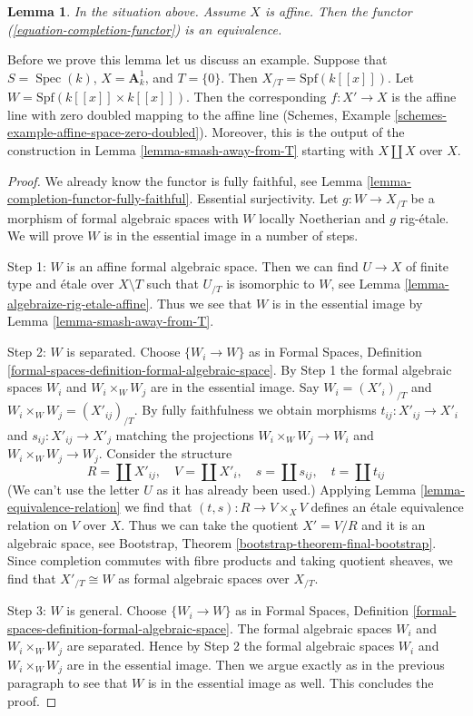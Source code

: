 \documentclass{stacks-project}
\theoremstyle{plain}
\newtheorem{lemma}[subsection]{Lemma}
\theoremstyle{definition}
\theoremstyle{remark}
\numberwithin{equation}{subsection}
\def\Spec{\mathop{\mathrm{Spec}}}
\begin{document}
\begin{lemma}
\label{lemma-dilatations-affine}
In the situation above. Assume $X$ is affine. Then the functor
(\ref{equation-completion-functor}) is an equivalence.
\end{lemma}

\noindent
Before we prove this lemma let us discuss an example. Suppose that
$S = \Spec(k)$, $X = \mathbf{A}^1_k$, and $T = \{0\}$. Then
$X_{/T} = \text{Spf}(k[[x]])$. Let $W = \text{Spf}(k[[x]] \times k[[x]])$.
Then the corresponding $f : X' \to X$ is the affine line with zero doubled
mapping to the affine line
(Schemes, Example \ref{schemes-example-affine-space-zero-doubled}).
Moreover, this is the output of the construction in
Lemma \ref{lemma-smash-away-from-T}
starting with $X \amalg X$ over $X$.

\begin{proof}
We already know the functor is fully faithful, see
Lemma \ref{lemma-completion-functor-fully-faithful}.
Essential surjectivity. Let $g : W \to X_{/T}$ be a morphism
of formal algebraic spaces with $W$ locally Noetherian
and $g$ rig-\'etale. We will prove $W$ is in the essential
image in a number of steps.

\medskip\noindent
Step 1: $W$ is an affine formal algebraic space. Then we can find
$U \to X$ of finite type and \'etale over $X \setminus T$ such that
$U_{/T}$ is isomorphic to $W$, see
Lemma \ref{lemma-algebraize-rig-etale-affine}.
Thus we see that $W$ is in the essential image by
Lemma \ref{lemma-smash-away-from-T}.

\medskip\noindent
Step 2: $W$ is separated. Choose $\{W_i \to W\}$ as in
Formal Spaces, Definition \ref{formal-spaces-definition-formal-algebraic-space}.
By Step 1 the formal algebraic spaces $W_i$ and $W_i \times_W W_j$
are in the essential image.
Say $W_i = (X'_i)_{/T}$ and $W_i \times_W W_j = (X'_{ij})_{/T}$.
By fully faithfulness we obtain morphisms $t_{ij} : X'_{ij} \to X'_i$
and $s_{ij} : X'_{ij} \to X'_j$ matching the projections
$W_i \times_W W_j \to W_i$ and $W_i \times_W W_j \to W_j$.
Consider the structure
$$
R = \coprod X'_{ij},\quad
V = \coprod X'_i,\quad
s = \coprod s_{ij},\quad
t = \coprod t_{ij}
$$
(We can't use the letter $U$ as it has already been used.)
Applying Lemma \ref{lemma-equivalence-relation} we find that
$(t, s) : R \to V \times_X V$ defines an \'etale equivalence relation
on $V$ over $X$. Thus we can take the quotient $X' = V/R$ and
it is an algebraic space, see
Bootstrap, Theorem \ref{bootstrap-theorem-final-bootstrap}.
Since completion commutes with fibre products and taking
quotient sheaves, we find that
$X'_{/T} \cong W$ as formal algebraic spaces over $X_{/T}$.

\medskip\noindent
Step 3: $W$ is general. Choose $\{W_i \to W\}$ as in
Formal Spaces, Definition \ref{formal-spaces-definition-formal-algebraic-space}.
The formal algebraic spaces $W_i$ and $W_i \times_W W_j$ are separated.
Hence by Step 2  the formal algebraic spaces $W_i$ and $W_i \times_W W_j$
are in the essential image. Then we argue exactly as in the previous
paragraph to see that $W$ is in the essential image as well.
This concludes the proof.
\end{proof}
\end{document}
